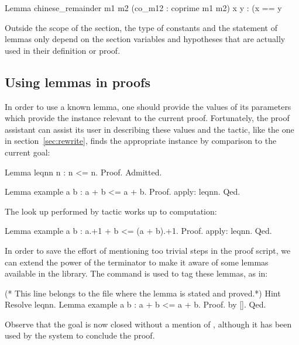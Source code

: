 \begin{coq}{}{}
Lemma chinese_remainder m1 m2 (co_m12 : coprime m1 m2) x y :
  (x == y %
\end{coq}

Outside the scope of the section, the type of constants and the
statement of lemmas only depend on the section variables and
hypotheses that are actually used in their definition or proof.



\subsection{Using lemmas in proofs}
\label{sec:quantifiedst}

In order to use a known lemma, one should provide the values of its
parameters which provide the instance relevant to the current
proof. Fortunately, the proof assistant can assist its user in
describing these values and the  tactic, like the
 one in section~\ref{sec:rewrite}, finds the appropriate
instance by comparison to the current goal:

\begin{coq}{}{}
Lemma leqnn n : n <= n. Proof. Admitted.

Lemma example a b : a + b <= a + b.
Proof. apply: leqnn. Qed.
\end{coq}
The look up performed by  tactic works up to computation:

\begin{coq}{}{}
Lemma example a b : a.+1 + b <= (a + b).+1.
Proof. apply: leqnn. Qed.
\end{coq}
In order to save the effort of mentioning too trivial
steps in the proof script, we can extend the power of the 
terminator to make it aware of some lemmas available in
the library. The  command is used to tag these lemmas,
as in:

\begin{coq}{}{}
(* This line belongs to the file where the lemma is stated and proved.*)
Hint Resolve leqnn.
Lemma example a b : a + b <= a + b.
Proof.  by [].  Qed.
\end{coq}
Observe that the goal is now closed without a mention of ,
although it has been used by the system to conclude the proof.

